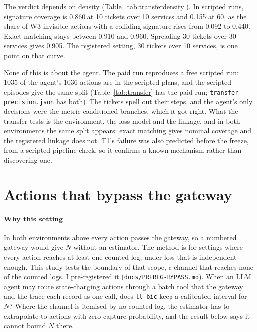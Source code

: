 \documentclass[11pt]{article}
\begin{document}
The verdict depends on density (Table~\ref{tab:transferdensity}). In scripted
runs, signature coverage is 0.860 at 10 tickets over 10 services and 0.155 at 60,
as the share of W3-invisible actions with a colliding signature rises from 0.092
to 0.440. Exact matching stays between 0.910 and 0.960. Spreading 30 tickets over
30 services gives 0.905. The registered setting, 30 tickets over 10 services, is
one point on that curve.


None of this is about the agent. The paid run reproduces a free scripted run:
1035 of the agent's 1036 actions are in the scripted plans, and the scripted
episodes give the same split (Table~\ref{tab:transfer} has the paid run;
\texttt{transfer-precision.json} has both). The tickets spell out their steps,
and the agent's only decisions were the metric-conditioned branches, which it
got right. What the transfer tests is the environment, the loss model and the
linkage, and in both environments the same split appears: exact matching gives
nominal coverage and the registered linkage does not. T1's failure was also
predicted before the freeze, from a scripted pipeline check, so it confirms a
known mechanism rather than discovering one.

\section{Actions that bypass the gateway}
\label{sec:bypass}

\paragraph{Why this setting.} In both environments above every action passes
the gateway, so a numbered gateway would give $N$ without an estimator. The method
is for settings where every action reaches at least one counted log, under loss that
is independent enough. This study tests the boundary of that scope, a channel that
reaches none of the counted logs. I pre-registered it
(\texttt{docs/PREREG-BYPASS.md}). When an LLM agent may route state-changing
actions through a batch tool that the gateway and the trace each record as one
call, does \texttt{ll\_bic} keep a calibrated interval for $N$? Where the channel is
itemised by no counted log, the estimator has to extrapolate to actions with zero
capture probability, and the result below says it cannot bound $N$ there.
\end{document}

